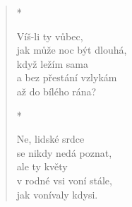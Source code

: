 \begin{verse}
*

Víš-li ty vůbec, \\
jak může noc být dlouhá,\\
když ležím sama\\
a bez přestání vzlykám\\
až do bílého rána?

*

Ne, lidské srdce \\
se nikdy nedá poznat, \\
ale ty květy \\
v rodné vsi voní stále, \\
jak vonívaly kdysi.
\end{verse}

